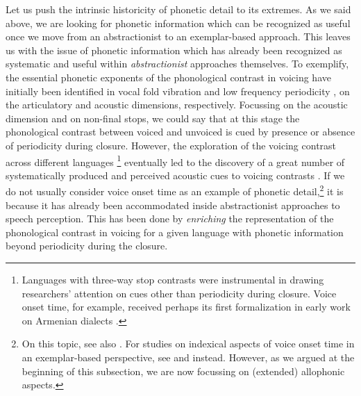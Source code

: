 Let us push the intrinsic historicity of phonetic detail to its extremes. As we said above, we are looking for phonetic information which can be recognized as useful once we move from an abstractionist to an exemplar-based approach. This leaves us with the issue of phonetic information which has already been recognized as systematic and useful within \textit{abstractionist} approaches themselves. To exemplify, the essential phonetic exponents of the phonological contrast in voicing \citep{trubeckoj1939grundzuege} have initially been identified in vocal fold vibration and low frequency periodicity \citep{jakobson1952preliminaries}, on the articulatory and acoustic dimensions, respectively. Focussing on the acoustic dimension and on non-final stops, we could say that at this stage the phonological contrast between voiced and unvoiced is cued by presence or absence of periodicity during closure. However, the exploration of the voicing contrast across different languages \citep{lisker1964crosslanguage}\footnote{Languages with three-way stop contrasts were instrumental in drawing researchers' attention on cues other than periodicity during closure. Voice onset time, for example, received perhaps its first formalization in early work on Armenian dialects \citep{adjarian1899explosives}.} eventually led to the discovery of a great number of systematically produced and perceived acoustic cues to voicing contrasts \citep{lisker1986voicing}. If we do not usually consider voice onset time as an example of phonetic detail,\footnote{On this topic, see also \citet{vanalphen2006effect}. For studies on indexical aspects of voice onset time in an exemplar-based perspective, see \citet{theodore2009characteristics} and \citet{levi2010priming} instead. However, as we argued at the beginning of this subsection, we are now focussing on (extended) allophonic aspects.} it is because it has already been accommodated inside abstractionist approaches to speech perception. This has been done by \textit{enriching} the representation of the phonological contrast in voicing for a given language with phonetic information beyond periodicity during the closure. 


